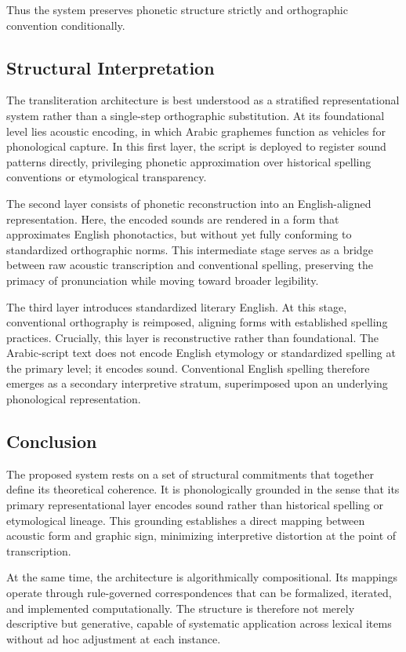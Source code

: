 \documentclass[12pt]{article}
\begin{document}
Thus the system preserves phonetic structure strictly and orthographic convention conditionally.

\subsection{Structural Interpretation}

The transliteration architecture is best understood as a stratified representational system rather than a single-step orthographic substitution. At its foundational level lies acoustic encoding, in which Arabic graphemes function as vehicles for phonological capture. In this first layer, the script is deployed to register sound patterns directly, privileging phonetic approximation over historical spelling conventions or etymological transparency.

The second layer consists of phonetic reconstruction into an English-aligned representation. Here, the encoded sounds are rendered in a form that approximates English phonotactics, but without yet fully conforming to standardized orthographic norms. This intermediate stage serves as a bridge between raw acoustic transcription and conventional spelling, preserving the primacy of pronunciation while moving toward broader legibility.

The third layer introduces standardized literary English. At this stage, conventional orthography is reimposed, aligning forms with established spelling practices. Crucially, this layer is reconstructive rather than foundational. The Arabic-script text does not encode English etymology or standardized spelling at the primary level; it encodes sound. Conventional English spelling therefore emerges as a secondary interpretive stratum, superimposed upon an underlying phonological representation.

\subsection{Conclusion}

The proposed system rests on a set of structural commitments that together define its theoretical coherence. It is phonologically grounded in the sense that its primary representational layer encodes sound rather than historical spelling or etymological lineage. This grounding establishes a direct mapping between acoustic form and graphic sign, minimizing interpretive distortion at the point of transcription.

At the same time, the architecture is algorithmically compositional. Its mappings operate through rule-governed correspondences that can be formalized, iterated, and implemented computationally. The structure is therefore not merely descriptive but generative, capable of systematic application across lexical items without ad hoc adjustment at each instance.
\end{document}
